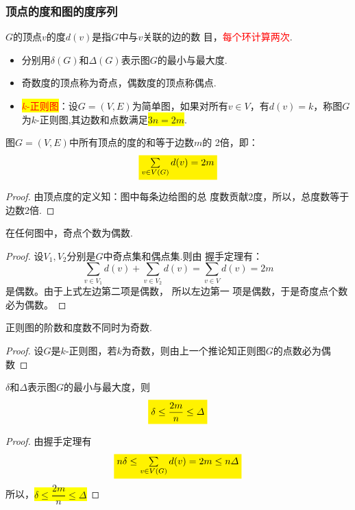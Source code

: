 \subsubsection{顶点的度和图的度序列}
\noindent {\bfseries \textcolor{ecolor}{顶点的度及其性质：}}
\begin{definition}[顶点的度]
$G$的顶点$v$的度$d(v)$是指$G$中与$v$关联的边的数
目，\textcolor{red}{每个环计算两次}.
\end{definition}
\begin{note}
	\begin{itemize}
		\item 分别用$\delta(G)$和$\varDelta(G)$表示图$G$的最小与最大度.
		\item 奇数度的顶点称为奇点，偶数度的顶点称偶点.
		\item \colorbox{yellow}{\textcolor{red}{$k$-正则图}}：设$G = (V, E)$为简单图，如果对所有$v\in V$，有$d(v) = k$，称图$G$为$k$-正则图,其边数和点数满足\colorbox{yellow}{$3n=2m$}.
	\end{itemize}
\end{note}

\begin{theorem}[握手定理]
	图$G=(V, E)$中所有顶点的度的和等于边数$m$的
	2倍，即：
	\[
	\colorbox{yellow}{$\sum\limits_{v\in V(G)} d(v)= 2m$}
	\]
\end{theorem}
\begin{proof}
	由顶点度的定义知：图中每条边给图的总
	度数贡献2度，所以，总度数等于边数2倍.
\end{proof}
\begin{corollary}
	在任何图中，奇点个数为偶数.
\end{corollary}
\begin{proof}
	设$V_1,V_2$分别是$G$中奇点集和偶点集.则由
	握手定理有：
	\[
	\sum\limits_{v\in V_1}d(v) + \sum\limits_{v\in V_2}d(v)= \sum\limits_{v\in V}d(v)=2m
	\]
	是偶数。由于上式左边第二项是偶数， 所以左边第一
	项是偶数，于是奇度点个数必为偶数。
\end{proof}

\begin{corollary}
	正则图的阶数和度数不同时为奇数.
\end{corollary}
\begin{proof}
设$G$是$k$-正则图，若$k$为奇数，则由上一个推论知正则图$G$的点数必为偶数
\end{proof}

\begin{corollary}
	$\delta$和$\varDelta$表示图$G$的最小与最大度，则
	\[
	\colorbox{yellow}{$\delta \leq \dfrac{2m}{n} \leq \varDelta$}
	\]
\end{corollary}
\begin{proof}
	由握手定理有
	\[
	\colorbox{yellow}{$n\delta \leq \sum\limits_{v\in V(G)} d(v)= 2m\leq n\varDelta$}
	\]
	所以，\colorbox{yellow}{$\delta \leq \dfrac{2m}{n} \leq \varDelta$}
\end{proof}


